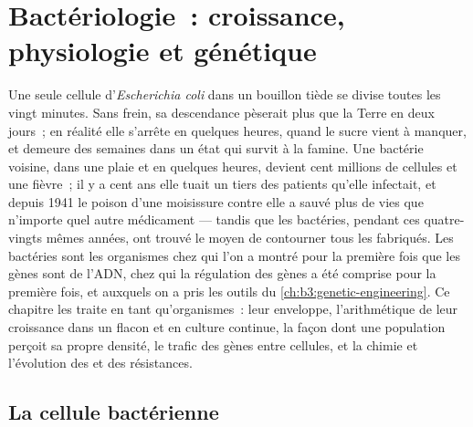 \chapter{Bactériologie~: croissance, physiologie et génétique}\label{ch:b3:bacteriology}

Une seule cellule d'\emph{Escherichia coli} dans un bouillon tiède se
divise toutes les vingt minutes. Sans frein, sa descendance pèserait
plus que la Terre en deux jours~; en réalité elle s'arrête en quelques
heures, quand le sucre vient à manquer, et demeure des semaines dans un
état qui survit à la famine. Une bactérie voisine, dans une plaie et en
quelques heures, devient cent millions de cellules et une fièvre~; il y
a cent ans elle tuait un tiers des patients qu'elle infectait, et depuis
1941 le poison d'une moisissure contre elle a sauvé plus de vies que
n'importe quel autre médicament --- tandis que les bactéries, pendant
ces quatre-vingts mêmes années, ont trouvé le moyen de contourner tous
les  fabriqués. Les bactéries sont les organismes chez qui
l'on a montré pour la première fois que les gènes sont de l'ADN, chez
qui la régulation des gènes a été comprise pour la première fois, et
auxquels on a pris les outils du \cref{ch:b3:genetic-engineering}. Ce
chapitre les traite en tant qu'organismes~: leur enveloppe,
l'arithmétique de leur croissance dans un flacon et en culture
continue, la façon dont une population perçoit sa propre densité, le
trafic des gènes entre cellules, et la chimie et l'évolution des
 et des résistances.

\section{La cellule bactérienne}

